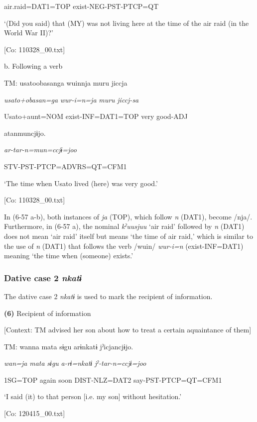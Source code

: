       air.raid=DAT1=TOP  exist-NEG-PST-PTCP=QT

      ‘(Did you said) that (MY) was not living here at the time of the air raid (in the World War II)?’

      [Co: 110328\_00.txt]

  b.  Following a verb

    TM:  usato{\textbar}obasan{\textbar}ga  wuinnja  muru  jiccja

      \textit{usato+obasan=ga}  \textit{wur-i=n=ja}  \textit{muru}  \textit{jiccj-sa}

      Usato+aunt=NOM  exist-INF=DAT1=TOP  very  good-ADJ

      atanmuncjɨjo.

      \textit{ar-tar-n=mun=ccjɨ=joo}

      STV-PST-PTCP=ADVRS=QT=CFM1

      ‘The time when Usato lived (here) was very good.’

      [Co: 110328\_00.txt]

In (6-57 a-b), both instances of \textit{ja} (TOP), which follow \textit{n} (DAT1), become /nja/. Furthermore, in (6-57 a), the nominal \textit{kˀuusjuu} ‘air raid’ followed by \textit{n} (DAT1) does not mean ‘air raid’ itself but means ‘the time of air raid,’ which is similar to the use of \textit{n} (DAT1) that follows the verb /wuin/ \textit{wur-i=n} (exist-INF=DAT1) meaning ‘the time when (someone) exists.’

\subsubsection{Dative case 2 \textit{nkatɨ}}

The dative case 2 \textit{nkatɨ} is used to mark the recipient of information.

\textbf{(6)}  Recipient of information

  [Context: TM advised her son about how to treat a certain aquaintance of them]

  TM:  wanna  mata  sɨgu  arɨnkatɨ  jˀicjancjɨjo.

    \textit{wan=ja}  \textit{mata}  \textit{sɨgu}  \textit{a-rɨ=nkatɨ}  \textit{jˀ-tar-n=ccjɨ=joo}

    1SG=TOP  again  soon  DIST-NLZ=DAT2  say-PST-PTCP=QT=CFM1

    ‘I said (it) to that person [i.e. my son] without hesitation.’

    [Co: 120415\_00.txt]

